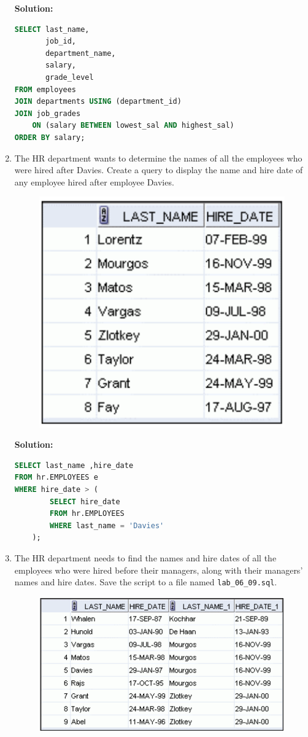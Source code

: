 \documentclass[a4paper,12pt]{article}
\begin{document}
\begin{enumerate}
\begin{figure}[h]
\end{figure}
\newpage
    \textbf{Solution: }
    \begin{lstlisting}[language=SQL]
SELECT last_name,
       job_id,
       department_name,
       salary,
       grade_level
FROM employees
JOIN departments USING (department_id)
JOIN job_grades 
    ON (salary BETWEEN lowest_sal AND highest_sal)
ORDER BY salary;
    \end{lstlisting}
    \item The HR department wants to determine the names of all the employees who were hired after
Davies. Create a query to display the name and hire date of any employee hired after employee
Davies.
    \begin{figure}[h]
        \centering
            \centering
            \includegraphics[width=.5\linewidth]{graphics/68.png}
    \end{figure}
    
    \textbf{Solution: }
    \begin{lstlisting}[language=SQL]
SELECT last_name ,hire_date
FROM hr.EMPLOYEES e
WHERE hire_date > (
        SELECT hire_date 
        FROM hr.EMPLOYEES 
        WHERE last_name = 'Davies'
    );
    \end{lstlisting}
    \item The HR department needs to find the names and hire dates of all the employees who were hired
before their managers, along with their managers' names and hire dates. Save the script to a file
named \texttt{lab\_06\_09.sql}.
\newpage 
\begin{figure}[h]
        \centering
            \centering
            \includegraphics[width=.7\linewidth]{graphics/69.png}
    \end{figure}
    

\end{enumerate}
\end{document}
